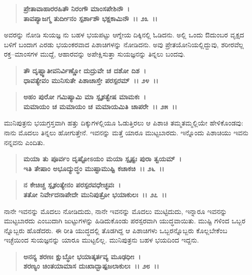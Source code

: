 \begin{verse}
\textbf{ಪ್ರೇತಾವಾಹಾರರಹಿತೌ ನಿರಂಗೌ ಮಾಂಸಪೇಶಿನೌ~।}\\\textbf{ತಾವಪ್ಯಾಜಗ್ಮ ತುರ್ದೀನಂ ಸ್ಪರ್ಶಾಶೌ ಭಕ್ಷಕಾಮಿನೌ~।। ೨೩~।।}
\end{verse}

ಅವರನ್ನು ನೋಡಿ ಸುಯಜ್ಞ ನು ಬಹಳ ಭಯಪಟ್ಟು ಆಗ್ನೇಯ ದಿಕ್ಕಿನಲ್ಲಿ ಓಡಿದನು. ಅಲ್ಲಿ ಒಂದು ಔದುಂಬರ ವೃಕ್ಷದ ಬಳಿಗೆ ಬಂದಾಗ ಎರಡು ಭಯಂಕರವಾದ ಪಿಶಾಚಿಗಳನ್ನು ನೋಡಿದನು. ಅವು ಪ್ರೇತಯೋನಿಯಲ್ಲಿದ್ದುವು, ಶರೀರವೆಲ್ಲ ರಕ್ತ–ಮಾಂಸಗಳ ಮುದ್ದೆ, ಆಹಾರವನ್ನು ಅಪೇಕ್ಷಿಸುತ್ತಾ ಸುಯಜ್ಞನನ್ನು ತಿನ್ನಲು ಬಂದವು.

\begin{verse}
\textbf{ತೌ ದೃಷ್ಟ್ವಾತೀವನಿರ್ವಿಣ್ಣೋ ದುದ್ರುವೇ ಚ ದಶೋ ದಿಶ~।}\\\textbf{ಧಾವತ್ಯೇವಂ ಮುನಿಸುತೇ ಪಿಶಾಚಾಸ್ತೇ ಪರಸ್ಪರಮ್~।। ೨೪~।। }
\end{verse}

\begin{verse}
\textbf{ಅಹಂ ಪುರೋ ಗಮಿಷ್ಯಾಮಿ ಮಾ ಸ್ಪೃಶತ್ವೇಷ ಮಾಮಕಃ~।}\\\textbf{ಮಮಾಯಂ ಚ ಮಮಾಯಂ ಚ ಮಮಾಯಮಿತಿ ಚಾಪರೇ~।। ೨೫~।।}
\end{verse}

ಮುನಿಪುತ್ರನು ಭಯಗ್ರಸ್ತವಾಗಿ ಹತ್ತು ದಿಕ್ಕುಗಳಲ್ಲಿಯೂ ಓಡುತ್ತಿರಲು ಆ ಪಿಶಾಚಿ ತಮ್ಮತಮ್ಮಲ್ಲಿಯೇ ಹೇಳಿಕೊಂಡವು: ನಾನು ಮೊದಲು ತಿನ್ನಲು ಹೋಗುತ್ತೇನೆ. ಇವನನ್ನು ಮತ್ತೆ ಯಾರೂ ಮುಟ್ಟಬಾರದು. ಇನ್ನೊಂದು ಪಿಶಾಚಿಯು ಇವನು ನನ್ನವನು ಎಂದಿತು.

\begin{verse}
\textbf{ಮಯಾ ತು ಪೂರ್ವಂ ದೃಷ್ಟೋಽಯಂ ಮಯಾ ಸ್ಪೃಷ್ಟಃ ಪುರಾ ತ್ವಯಮ್~।}\\\textbf{ಇತಿ ತೇಷಾಂ ಅಭೂದ್ಯುದ್ಧಂ ಮುಷ್ಟಾಮುಷ್ಟಿ ಕಚಾಕಚಿ~।। ೨೬~।।}
\end{verse}

\begin{verse}
\textbf{ನ ಕೇಚಿಚ್ಚ ಸ್ಪೃಶಂತ್ಯೇನಂ ಪರಸ್ಪರವಧೇಚ್ಛವಃ~।}\\\textbf{ತತೋ ನಿರ್ವೇದನಾಪೇದೇ ಮುನಿಪುತ್ರೋ ಭಯಾಕುಲಃ~।। ೨೭~।।}
\end{verse}

ನಾನೇ ಇವನನ್ನು ಮೊದಲು ನೋಡಿದುದು, ನಾನೇ ಇವನನ್ನು ಮೊದಲು ಮುಟ್ಟಿದುದು, ಇನ್ನಾರೂ ಇವನನ್ನು ಮುಟ್ಟಬಾರದು ಎಂಬುದಾಗಿ ಜುಟ್ಟುಗಳನ್ನು ಹಿಡಿದುಕೊಂಡು ಪರಸ್ಪರವಾಗಿ ಯುದ್ಧವಾಯಿತು. ಮುಷ್ಟಿ ಗಳಿಂದ ಒಬ್ಬರ ನ್ನೊಬ್ಬರು ಹೊಡೆದರು. ಈ ರೀತಿ ಯುದ್ಧದಲ್ಲಿ ತೊಡಗಿದ್ದ ಆ ಪಿಶಾಚಿಗಳು ಒಬ್ಬರನ್ನೊಬ್ಬರು ಕೊಲ್ಲಬೇಕೆಂಬ ಇಚ್ಛೆಯಿಂದ ಸುಯಜ್ಞನನ್ನು ಯಾರೂ ಮುಟ್ಟಲಿಲ್ಲ. ಮುನಿಪುತ್ರನು ಬಹಳ ಭಯದಿಂದ ಇದ್ದನು.

\begin{verse}
\textbf{ಅನನ್ಯ ಶರಣಃ ಕ್ಷುಬ್ಧೋ ಭಯಾತ್ಕರ್ತವ್ಯ ಮೂಢಧೀಃ~।}\\\textbf{ಶರಣ್ಯಂ ಚಿಂತಯಾಮಾಸ ದುಃಖಾದ್ಬಾಷ್ಪಜಲಾಕುಲಃ~।। ೨೮~।।}
\end{verse}

